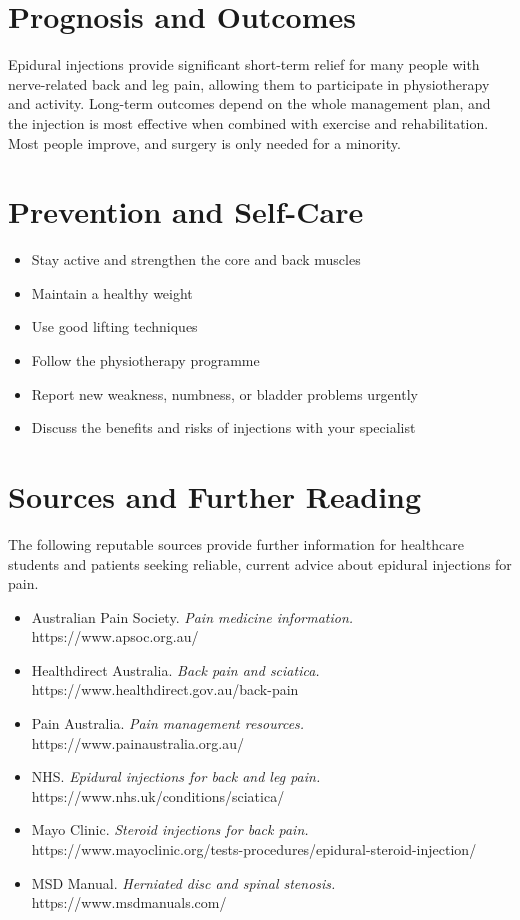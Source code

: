 \section*{Prognosis and Outcomes}
Epidural injections provide significant short-term relief for many people with nerve-related back and leg pain, allowing them to participate in physiotherapy and activity. Long-term outcomes depend on the whole management plan, and the injection is most effective when combined with exercise and rehabilitation. Most people improve, and surgery is only needed for a minority.

\section*{Prevention and Self-Care}
\begin{itemize}
    \item Stay active and strengthen the core and back muscles
    \item Maintain a healthy weight
    \item Use good lifting techniques
    \item Follow the physiotherapy programme
    \item Report new weakness, numbness, or bladder problems urgently
    \item Discuss the benefits and risks of injections with your specialist
\end{itemize}

\section*{Sources and Further Reading}
The following reputable sources provide further information for healthcare students and patients seeking reliable, current advice about epidural injections for pain.
\begin{itemize}
    \item Australian Pain Society. \textit{Pain medicine information.} https://www.apsoc.org.au/
    \item Healthdirect Australia. \textit{Back pain and sciatica.} https://www.healthdirect.gov.au/back-pain
    \item Pain Australia. \textit{Pain management resources.} https://www.painaustralia.org.au/
    \item NHS. \textit{Epidural injections for back and leg pain.} https://www.nhs.uk/conditions/sciatica/
    \item Mayo Clinic. \textit{Steroid injections for back pain.} https://www.mayoclinic.org/tests-procedures/epidural-steroid-injection/
    \item MSD Manual. \textit{Herniated disc and spinal stenosis.} https://www.msdmanuals.com/
\end{itemize}
